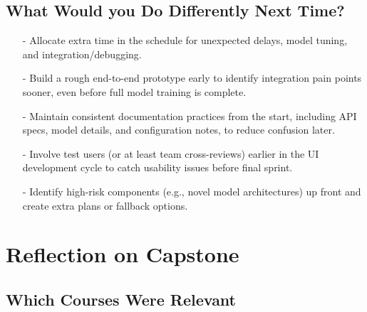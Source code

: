 \documentclass{article}
\begin{document}
\subsection{What Would you Do Differently Next Time?}

\begin{enumerate}
    \item[-] Allocate extra time in the schedule for unexpected delays, model tuning, and integration/debugging.
    \item[-] Build a rough end-to-end prototype early to identify integration pain points sooner, even before full model training is complete.
    \item[-] Maintain consistent documentation practices from the start, including API specs, model details, and configuration notes, to reduce confusion later.
    \item[-] Involve test users (or at least team cross-reviews) earlier in the UI development cycle to catch usability issues before final sprint.
    \item[-] Identify high-risk components (e.g., novel model architectures) up front and create extra plans or fallback options.
\end{enumerate}

\section{Reflection on Capstone}

\subsection{Which Courses Were Relevant}
\end{document}
